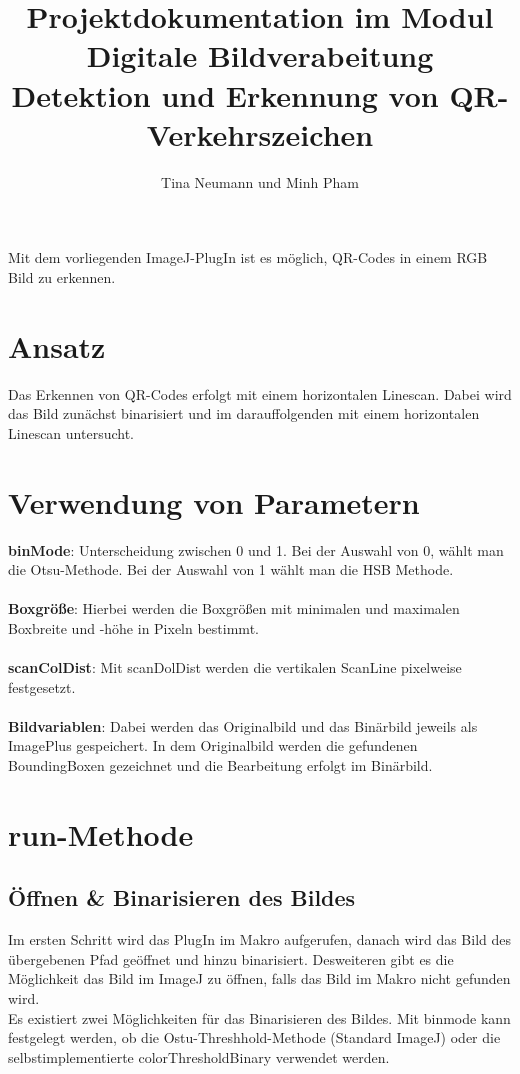 \documentclass[a4paper,11pt,parskip]{article}
\begin{document}
\title{Projektdokumentation im Modul Digitale Bildverabeitung\\  
\textbf{Detektion und Erkennung von QR-Verkehrszeichen}}
\author{Tina Neumann und Minh Pham}

\maketitle

Mit dem vorliegenden ImageJ-PlugIn ist es möglich, QR-Codes in einem RGB Bild zu erkennen.\\

\section{Ansatz}
Das Erkennen von QR-Codes erfolgt mit einem horizontalen Linescan. Dabei wird das Bild zunächst binarisiert und im darauffolgenden mit einem horizontalen Linescan untersucht.

\section{Verwendung von Parametern}
\textbf{binMode}: Unterscheidung zwischen 0 und 1. Bei der Auswahl von 0, wählt man die Otsu-Methode. Bei der Auswahl von 1 wählt man die HSB Methode.\\ \\
\textbf{Boxgröße}: Hierbei werden die Boxgrößen mit minimalen und maximalen Boxbreite und -höhe in Pixeln bestimmt.\\ \\
\textbf{scanColDist}: Mit scanDolDist werden die vertikalen ScanLine pixelweise festgesetzt.\\ \\
\textbf{Bildvariablen}: Dabei werden das Originalbild und das Binärbild jeweils als  ImagePlus gespeichert. In dem Originalbild werden die gefundenen BoundingBoxen gezeichnet und die Bearbeitung erfolgt im Binärbild.

\section{run-Methode}

\subsection{Öffnen \& Binarisieren des Bildes}
Im ersten Schritt wird das PlugIn im Makro aufgerufen, danach wird das Bild des übergebenen Pfad geöffnet und hinzu binarisiert. Desweiteren gibt es die Möglichkeit das Bild im ImageJ zu öffnen, falls das Bild im Makro nicht gefunden wird.\\
Es existiert zwei Möglichkeiten für das Binarisieren des Bildes. Mit binmode kann festgelegt werden, ob die Ostu-Threshhold-Methode (Standard ImageJ) oder die selbstimplementierte colorThresholdBinary verwendet werden.
\end{document}
